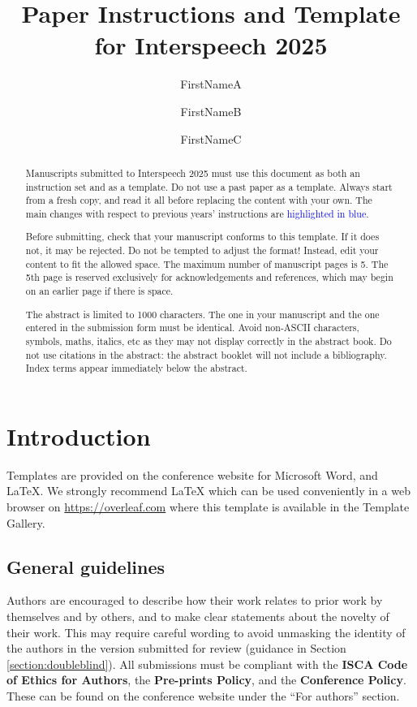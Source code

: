 \documentclass{Interspeech}
\title{Paper Instructions and Template for Interspeech 2025}
\author[affiliation={1}]{FirstNameA}{LastNameA}
\author[affiliation={2,3}]{FirstNameB}{LastNameB}
\author[affiliation={1,3}]{FirstNameC}{LastNameC}
\affiliation{First Department}{First Affiliation}{First Country}
\affiliation{Second Department}{Second Affiliation}{Second Country}
\affiliation{}{Just Institute}{And Country}
\newcommand{\blue}[1]{\textcolor{blue}{#1}}
\begin{document}
\maketitle

\begin{abstract}
    
    Manuscripts submitted to Interspeech 2025 must use this document as both an instruction set and as a template. Do not use a past paper as a template. Always start from a fresh copy, and read it all before replacing the content with your own. The main changes with respect to previous years' instructions are \blue{highlighted in blue}.
    
    Before submitting, check that your manuscript conforms to this template. If it does not, it may be rejected. Do not be tempted to adjust the format! Instead, edit your content to fit the allowed space. The maximum number of manuscript pages is 5. The 5th page is reserved exclusively for acknowledgements and references, which may begin on an earlier page if there is space.
    
    The abstract is limited to 1000 characters. The one in your manuscript and the one entered in the submission form must be identical. Avoid non-ASCII characters, symbols, maths, italics, etc as they may not display correctly in the abstract book. Do not use citations in the abstract: the abstract booklet will not include a bibliography.  Index terms appear immediately below the abstract. 
\end{abstract}




\section{Introduction}

Templates are provided on the conference website for Microsoft Word\textregistered, and \LaTeX. We strongly recommend \LaTeX\xspace
which can be used conveniently in a web browser on \url{https://overleaf.com} where this template is available in the Template Gallery.

\subsection{General guidelines}

Authors are encouraged to describe how their work relates to prior work by themselves and by others, and to make clear statements about the novelty of their work. This may require careful wording to avoid unmasking the identity of the authors in the version submitted for review (guidance in Section \ref{section:doubleblind}). All submissions must be compliant with the \textbf{ISCA Code of Ethics for Authors}, the \textbf{Pre-prints Policy}, and the \textbf{Conference Policy}. These can be found on the conference website under the ``For authors'' section.
\end{document}
